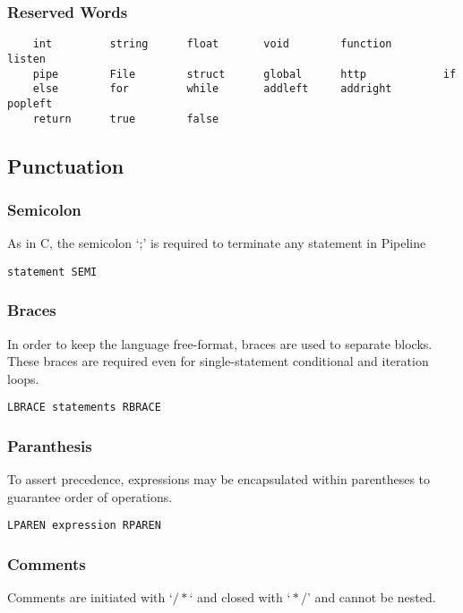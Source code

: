 \documentclass[./LRM_main.tex]{subfiles}
\begin{document}
\subsubsection{Reserved Words}
\begin{lstlisting}
	int         string      float		void		function        listen
    pipe        File        struct      global      http            if
    else        for         while       addleft     addright        popleft
    return      true        false
\end{lstlisting}
\subsection{Punctuation}
\subsubsection{Semicolon}
As in C, the semicolon ‘;’ is required to terminate any statement in Pipeline
\begin{lstlisting}
statement SEMI
\end{lstlisting}

\subsubsection{Braces}
In order to keep the language free-format, braces are used to separate blocks. These braces are required even for single-statement conditional and iteration loops. 
\begin{lstlisting}
LBRACE statements RBRACE
\end{lstlisting}

\subsubsection{Paranthesis}
To assert precedence, expressions may be encapsulated within parentheses to guarantee order of operations.
\begin{lstlisting}
LPAREN expression RPAREN
\end{lstlisting}

\subsubsection{Comments }
Comments are initiated with $‘/* ‘$ and closed with $‘*/’$ and cannot be nested.


\end{document}
